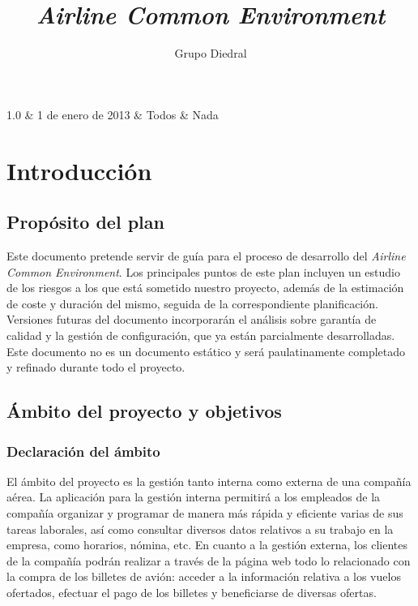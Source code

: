 \documentclass[11pt, a4paper, twoside, titlepage]{article}
\title{\doctitle\\\textsl{Airline Common Environment}}
\author{Grupo Diedral}
\newcommand*{\doctitle}{Plan de proyecto}
\begin{document}
	\begin{tablacambios}
		1.0 & 1 de enero de 2013 & Todos & Nada
	\end{tablacambios}

	\portadaace{\doctitle}
	
	\tableofcontents
	\newpage

	\section{Introducción}
	\iniciarnumeraciondiedral
		\subsection{Propósito del plan}
			Este documento pretende servir de guía para el proceso de desarrollo del \software \textit{Airline Common Environment}. Los principales puntos de este plan incluyen un estudio de los riesgos a los que está sometido nuestro proyecto, además de la estimación de coste y duración del mismo, seguida de la correspondiente planificación. Versiones futuras del documento incorporarán el análisis sobre garantía de calidad y la gestión de configuración, que ya están parcialmente desarrolladas.\\

			Este documento no es un documento estático y será paulatinamente completado y refinado durante todo el proyecto.
		
		\subsection{Ámbito del proyecto y objetivos}
			\subsubsection{Declaración del ámbito}
			El ámbito del proyecto es la gestión tanto interna como externa de una compañía aérea. La aplicación para la gestión interna permitirá a los empleados de la compañía organizar y programar de manera más rápida y eficiente varias de sus tareas laborales, así como consultar diversos datos relativos a su trabajo en la empresa, como horarios, nómina, etc. En cuanto a la gestión externa, los clientes de la compañía podrán realizar a través de la página web todo lo relacionado con la compra de los billetes de avión: acceder a la información relativa a los vuelos ofertados, efectuar el pago de los billetes y beneficiarse de diversas ofertas.
\end{document}

